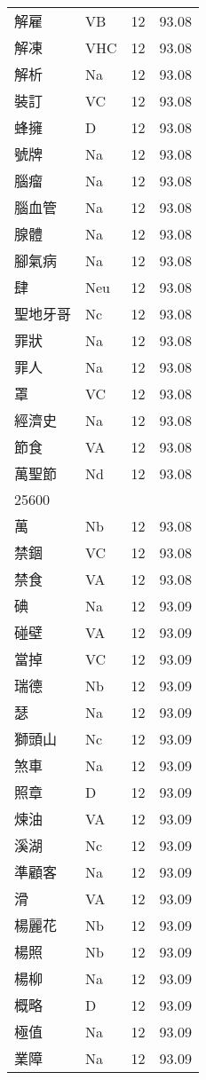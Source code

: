 \documentclass[twocolumn]{book}
\begin{document}
\begin{supertabular}{llrr}
解雇 & VB & 12 &  93.08\\
解凍 & VHC & 12 &  93.08\\
解析 & Na & 12 &  93.08\\
裝訂 & VC & 12 &  93.08\\
蜂擁 & D & 12 &  93.08\\
號牌 & Na & 12 &  93.08\\
腦瘤 & Na & 12 &  93.08\\
腦血管 & Na & 12 &  93.08\\
腺體 & Na & 12 &  93.08\\
腳氣病 & Na & 12 &  93.08\\
肆 & Neu & 12 &  93.08\\
聖地牙哥 & Nc & 12 &  93.08\\
罪狀 & Na & 12 &  93.08\\
罪人 & Na & 12 &  93.08\\
罩 & VC & 12 &  93.08\\
經濟史 & Na & 12 &  93.08\\
節食 & VA & 12 &  93.08\\
萬聖節 & Nd & 12 &  93.08\\
25600\\
萬 & Nb & 12 &  93.08\\
禁錮 & VC & 12 &  93.08\\
禁食 & VA & 12 &  93.08\\
碘 & Na & 12 &  93.09\\
碰壁 & VA & 12 &  93.09\\
當掉 & VC & 12 &  93.09\\
瑞德 & Nb & 12 &  93.09\\
瑟 & Na & 12 &  93.09\\
獅頭山 & Nc & 12 &  93.09\\
煞車 & Na & 12 &  93.09\\
照章 & D & 12 &  93.09\\
煉油 & VA & 12 &  93.09\\
溪湖 & Nc & 12 &  93.09\\
準顧客 & Na & 12 &  93.09\\
滑 & VA & 12 &  93.09\\
楊麗花 & Nb & 12 &  93.09\\
楊照 & Nb & 12 &  93.09\\
楊柳 & Na & 12 &  93.09\\
概略 & D & 12 &  93.09\\
極值 & Na & 12 &  93.09\\
業障 & Na & 12 &  93.09\\

\end{supertabular}
\end{document}
